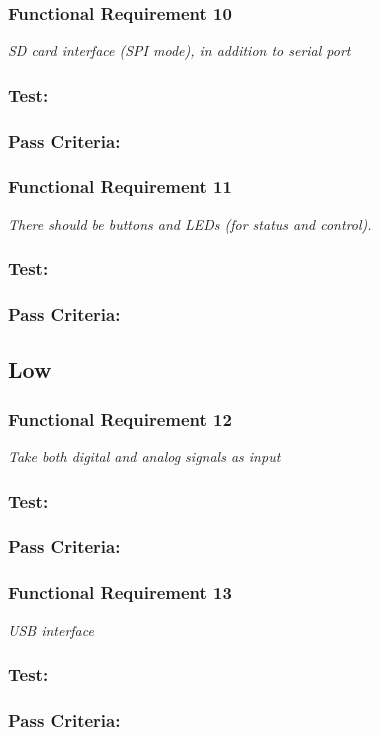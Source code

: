 \subsubsection*{Functional Requirement 10}
\textit{SD card interface (SPI mode), in addition to serial port}
\subsubsection*{Test:}
\subsubsection*{Pass Criteria:}

\subsubsection*{Functional Requirement 11}
\textit{There should be buttons and LEDs (for status and control).}
\subsubsection*{Test:}
\subsubsection*{Pass Criteria:}


\subsection{Low}
\subsubsection*{Functional Requirement 12}
\textit{Take both digital and analog signals as input}
\subsubsection*{Test:}
\subsubsection*{Pass Criteria:}

\subsubsection*{Functional Requirement 13}
\textit{USB interface}
\subsubsection*{Test:}
\subsubsection*{Pass Criteria:}

